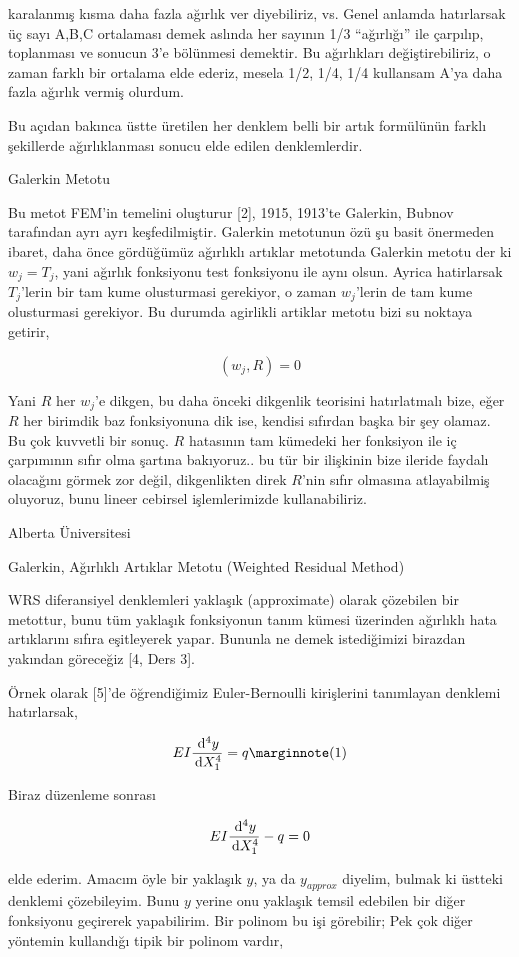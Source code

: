 \documentclass[12pt,fleqn]{article}\usepackage{../../common}
\begin{document}
karalanmış kısma daha fazla ağırlık ver diyebiliriz, vs. Genel anlamda
hatırlarsak üç sayı A,B,C ortalaması demek aslında her sayının 1/3 ``ağırlığı''
ile çarpılıp, toplanması ve sonucun 3'e bölünmesi demektir. Bu ağırlıkları
değiştirebiliriz, o zaman farklı bir ortalama elde ederiz, mesela 1/2, 1/4, 1/4
kullansam A'ya daha fazla ağırlık vermiş olurdum.

Bu açıdan bakınca üstte üretilen her denklem belli bir artık formülünün
farklı şekillerde ağırlıklanması sonucu elde edilen denklemlerdir.

Galerkin Metotu

Bu metot FEM'in temelini oluşturur [2], 1915, 1913'te Galerkin, Bubnov
tarafından ayrı ayrı keşfedilmiştir. Galerkin metotunun özü şu basit önermeden
ibaret, daha önce gördüğümüz ağırlıklı artıklar metotunda Galerkin metotu der ki
$w_j = T_j$, yani ağırlık fonksiyonu test fonksiyonu ile aynı olsun. Ayrica
hatirlarsak $T_j$'lerin bir tam kume olusturmasi gerekiyor, o zaman $w_j$'lerin
de tam kume olusturmasi gerekiyor. Bu durumda agirlikli artiklar metotu bizi su
noktaya getirir,

$$
(w_j,R) = 0
$$

Yani $R$ her $w_j$'e dikgen, bu daha önceki dikgenlik teorisini hatırlatmalı
bize, eğer $R$ her birimdik baz fonksiyonuna dik ise, kendisi sıfırdan başka bir
şey olamaz. Bu çok kuvvetli bir sonuç. $R$ hatasının tam kümedeki her fonksiyon
ile iç çarpımının sıfır olma şartına bakıyoruz.. bu tür bir ilişkinin bize
ileride faydalı olacağını görmek zor değil, dikgenlikten direk $R$'nin sıfır
olmasına atlayabilmiş oluyoruz, bunu lineer cebirsel işlemlerimizde
kullanabiliriz.

Alberta Üniversitesi

Galerkin, Ağırlıklı Artıklar Metotu (Weighted Residual Method)

WRS diferansiyel denklemleri yaklaşık (approximate) olarak çözebilen bir
metottur, bunu tüm yaklaşık fonksiyonun tanım kümesi üzerinden ağırlıklı hata
artıklarını sıfıra eşitleyerek yapar. Bununla ne demek istediğimizi birazdan
yakından göreceğiz [4, Ders 3].

Örnek olarak [5]'de öğrendiğimiz Euler-Bernoulli kirişlerini tanımlayan denklemi
hatırlarsak,

$$
E I \frac{\ud^4 y}{\ud X_1^4} = q
\mlabel{1}
$$

Biraz düzenleme sonrası

$$
E I \frac{\,\mathrm{d}^4 y}{\,\mathrm{d} X_1^4} - q = 0
$$

elde ederim. Amacım öyle bir yaklaşık $y$, ya da $y_{approx}$ diyelim, bulmak ki
üstteki denklemi çözebileyim. Bunu $y$ yerine onu yaklaşık temsil edebilen bir
diğer fonksiyonu geçirerek yapabilirim. Bir polinom bu işi görebilir; Pek çok
diğer yöntemin kullandığı tipik bir polinom vardır,
\end{document}
